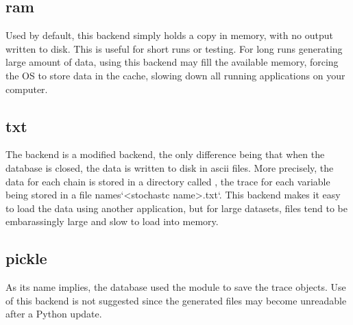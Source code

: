 
\hypertarget{ram}{}
\subsection*{ram}
\label{ram}

Used by default, this backend simply holds a copy in memory, with no output written to disk. This is useful for short runs or testing. For long runs generating large amount of data, using this backend may fill the available memory, forcing the OS to store data in the cache, slowing down all running applications on your computer.



\hypertarget{txt}{}
\subsection*{txt}
\label{txt}

The  backend is a modified  backend, the only difference being that when the database is closed, the data is written to disk in ascii files. More precisely, the data for each chain is stored in a directory called , the trace for each variable being stored in a file names`{\textless}stochastc name{\textgreater}.txt`. This backend makes it easy to load the data using another application, but for large datasets, files tend to be embarassingly large and slow to load into memory.



\hypertarget{pickle}{}
\subsection*{pickle}
\label{pickle}

As its name implies, the  database used the  module to save the trace objects. Use of this backend is not suggested since the generated files may become unreadable after a Python update.



\hypertarget{sqlite}{}

